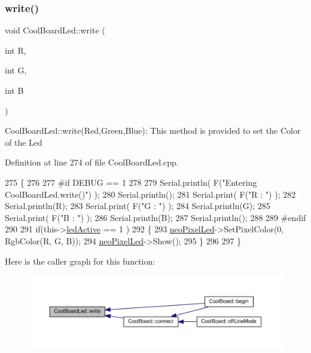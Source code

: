 \subsubsection{\texorpdfstring{write()}{write()}}
{\footnotesize\ttfamily void Cool\+Board\+Led\+::write (\begin{DoxyParamCaption}\item[{int}]{R,  }\item[{int}]{G,  }\item[{int}]{B }\end{DoxyParamCaption})}

Cool\+Board\+Led\+::write(\+Red,\+Green,\+Blue)\+: This method is provided to set the Color of the Led 

Definition at line 274 of file Cool\+Board\+Led.\+cpp.


\begin{DoxyCode}
275 \{
276 
277 \textcolor{preprocessor}{#if DEBUG == 1}
278 
279     Serial.println( F(\textcolor{stringliteral}{"Entering CoolBoardLed.write()"}) );
280     Serial.println();
281     Serial.print( F(\textcolor{stringliteral}{"R : "}) );
282     Serial.println(R);
283     Serial.print( F(\textcolor{stringliteral}{"G : "}) );
284     Serial.println(G);
285     Serial.print( F(\textcolor{stringliteral}{"B : "}) );
286     Serial.println(B);
287     Serial.println();   
288 
289 \textcolor{preprocessor}{#endif}
290 
291     \textcolor{keywordflow}{if}(this->\hyperlink{class_cool_board_led_aadd04d2ecf123247718d77f42fba7f08}{ledActive} == 1 )
292     \{
293         \hyperlink{class_cool_board_led_ac2c13fa462a010cd9242bf297c013923}{neoPixelLed}->SetPixelColor(0, RgbColor(R, G, B));
294         \hyperlink{class_cool_board_led_ac2c13fa462a010cd9242bf297c013923}{neoPixelLed}->Show();
295     \}
296 
297 \}
\end{DoxyCode}
Here is the caller graph for this function\+:\nopagebreak
\begin{figure}[H]
\begin{center}
\leavevmode
\includegraphics[width=350pt]{de/dc0/class_cool_board_led_a30fadd4cbec17ceea428bf7a32207e87_icgraph}
\end{center}
\end{figure}


